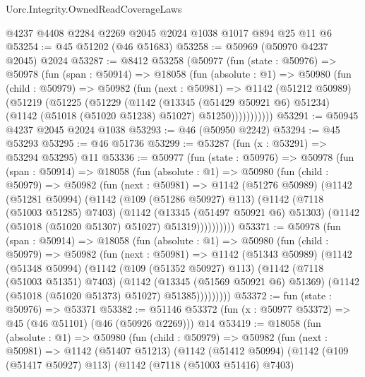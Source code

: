\begin{lexlean}{Uorc.Integrity.OwnedReadCoverageLaws}
\begin{coremodule}
    @4237
    @4408
    @2284
    @2269
    @2045
    @2024
    @1038
    @1017
    @894
    @25
    @11
    @6
@53254 := @45 @51202 (@46 @51683)
@53258 := @50969 (@50970 @4237 @2045) @2024
@53287 := @8412
    @53258
    (@50977
      (fun (state : @50976) =>
      @50978
        (fun (span : @50914) =>
        @18058
          (fun (absolute : @1) =>
          @50980
            (fun (child : @50979) =>
            @50982
              (fun (next : @50981) =>
              @1142
                (@51212 @50989)
                (@51219
                  (@51225
                    (@51229
                      (@1142
                        (@13345 (@51429 @50921 @6) @51234)
                        (@1142 (@51018 (@51020 @51238) @51027) @51250)))))))))))
@53291 := @50945 @4237 @2045 @2024 @1038
@53293 := @46 (@50950 @2242)
@53294 := @45 @53293
@53295 := @46 @51736
@53299 := @53287 (fun (x : @53291) => @53294 @53295) @11
@53336 := @50977
    (fun (state : @50976) =>
    @50978
      (fun (span : @50914) =>
      @18058
        (fun (absolute : @1) =>
        @50980
          (fun (child : @50979) =>
          @50982
            (fun (next : @50981) =>
            @1142
              (@51276 @50989)
              (@1142
                (@51281 @50994)
                (@1142
                  (@109 (@51286 @50927) @113)
                  (@1142
                    (@7118 (@51003 @51285) @7403)
                    (@1142
                      (@13345 (@51497 @50921 @6) @51303)
                      (@1142 (@51018 (@51020 @51307) @51027) @51319))))))))))
@53371 := @50978
    (fun (span : @50914) =>
    @18058
      (fun (absolute : @1) =>
      @50980
        (fun (child : @50979) =>
        @50982
          (fun (next : @50981) =>
          @1142
            (@51343 @50989)
            (@1142
              (@51348 @50994)
              (@1142
                (@109 (@51352 @50927) @113)
                (@1142
                  (@7118 (@51003 @51351) @7403)
                  (@1142
                    (@13345 (@51569 @50921 @6) @51369)
                    (@1142 (@51018 (@51020 @51373) @51027) @51385)))))))))
@53372 := fun (state : @50976) => @53371
@53382 := @51146 @53372 (fun (x : @50977 @53372) => @45 (@46 @51101) (@46 (@50926 @2269))) @14
@53419 := @18058
    (fun (absolute : @1) =>
    @50980
      (fun (child : @50979) =>
      @50982
        (fun (next : @50981) =>
        @1142
          (@51407 @51213)
          (@1142
            (@51412 @50994)
            (@1142
              (@109 (@51417 @50927) @113)
              (@1142
                (@7118 (@51003 @51416) @7403)

\end{coremodule}
\end{lexlean}
